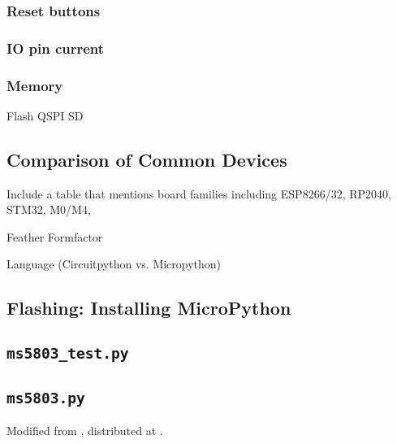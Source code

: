   \subsubsection{Reset buttons}

  \subsubsection{IO pin current}

  \subsubsection{Memory}
  Flash
  QSPI
  SD

  \subsection{Comparison of Common Devices}
  Include a table that mentions board families including ESP8266/32, RP2040, STM32, M0/M4,





  Feather Formfactor

  Language (Circuitpython vs. Micropython)

  \subsection{Flashing: Installing MicroPython}




  \subsection{\lstinline{ms5803_test.py}}
  

  \subsection{\lstinline{ms5803.py}}
  

  Modified from , distributed at .
%
